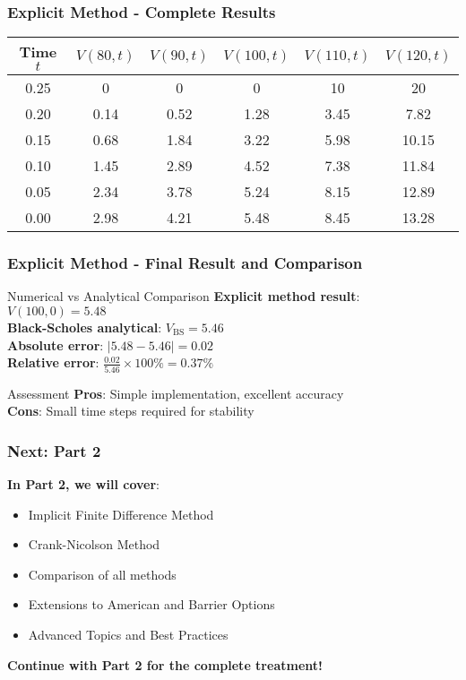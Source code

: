 \documentclass[aspectratio=169]{beamer}
\begin{document}
\begin{frame}
\frametitle{Explicit Method - Complete Results}
\begin{center}
\begin{tabular}{c|c|c|c|c|c}
Time $t$ & $V(80,t)$ & $V(90,t)$ & $V(100,t)$ & $V(110,t)$ & $V(120,t)$ \\
\hline
0.25 & 0 & 0 & 0 & 10 & 20 \\
0.20 & 0.14 & 0.52 & 1.28 & 3.45 & 7.82 \\
0.15 & 0.68 & 1.84 & 3.22 & 5.98 & 10.15 \\
0.10 & 1.45 & 2.89 & 4.52 & 7.38 & 11.84 \\
0.05 & 2.34 & 3.78 & 5.24 & 8.15 & 12.89 \\
0.00 & 2.98 & 4.21 & 5.48 & 8.45 & 13.28 \\
\end{tabular}
\end{center}
\end{frame}

\begin{frame}
\frametitle{Explicit Method - Final Result and Comparison}
\begin{block}{Numerical vs Analytical Comparison}
\textbf{Explicit method result}: $V(100, 0) = 5.48$\\
\textbf{Black-Scholes analytical}: $V_{\text{BS}} = 5.46$\\
\textbf{Absolute error}: $|5.48 - 5.46| = 0.02$\\
\textbf{Relative error}: $\frac{0.02}{5.46} \times 100\% = 0.37\%$
\end{block}

\begin{block}{Assessment}
\textbf{Pros}: Simple implementation, excellent accuracy\\
\textbf{Cons}: Small time steps required for stability
\end{block}
\end{frame}

\begin{frame}
\frametitle{Next: Part 2}
\textbf{In Part 2, we will cover}:
\begin{itemize}
\item Implicit Finite Difference Method
\item Crank-Nicolson Method
\item Comparison of all methods
\item Extensions to American and Barrier Options
\item Advanced Topics and Best Practices
\end{itemize}

\textbf{Continue with Part 2 for the complete treatment!}
\end{frame}
\end{document}
